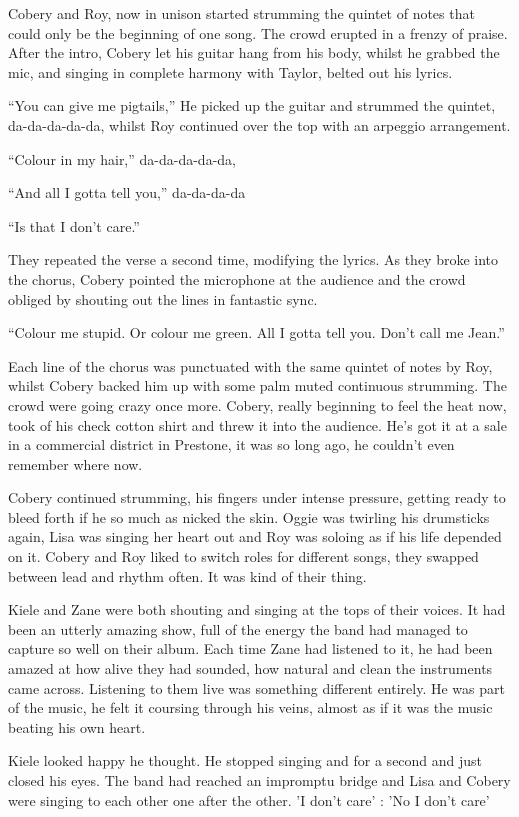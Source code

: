 Cobery and Roy, now in unison started strumming the quintet of notes that could only be the beginning of one song.  The crowd erupted in a frenzy of praise.  After the intro, Cobery let his guitar hang from his body, whilst he grabbed the mic, and singing in complete harmony with Taylor, belted out his lyrics.

``You can give me pigtails,'' He picked up the guitar and strummed the quintet, da-da-da-da-da, whilst Roy continued over the top with an arpeggio arrangement.  

``Colour in my hair,'' da-da-da-da-da,

``And all I gotta tell you,'' da-da-da-da

``Is that I don't care.''

They repeated the verse a second time, modifying the lyrics.  As they broke into the chorus, Cobery pointed the microphone at the audience and the crowd obliged by shouting out the lines in fantastic sync.  

``Colour me stupid. Or colour me green.  All I gotta tell you. Don't call me Jean.''

Each line of the chorus was punctuated with the same quintet of notes by Roy, whilst Cobery backed him up with some palm muted continuous strumming.  The crowd were going crazy once more.  Cobery, really beginning to feel the heat now, took of his check cotton shirt and threw it into the audience.  He's got it at a sale in a commercial district in Prestone, it was so long ago, he couldn't even remember where now.  

Cobery continued strumming, his fingers under intense pressure, getting ready to bleed forth if he so much as nicked the skin.  Oggie was twirling his drumsticks again, Lisa was singing her heart out and Roy was soloing as if his life depended on it.  Cobery and Roy liked to switch roles for different songs, they swapped between lead and rhythm often.  It was kind of their thing.

Kiele and Zane were both shouting and singing at the tops of their voices.  It had been an utterly amazing show, full of the energy the band had managed to capture so well on their album.  Each time Zane had listened to it, he had been amazed at how alive they had sounded, how natural and clean the instruments came across.  Listening to them live was something different entirely.  He was part of the music, he felt it coursing through his veins, almost as if it was the music beating his own heart.

Kiele looked happy he thought.  He stopped singing and for a second and just closed his eyes.  The band had reached an impromptu bridge and  Lisa and Cobery were singing to each other one after the other.  'I don't care' : 'No I don't care'  

